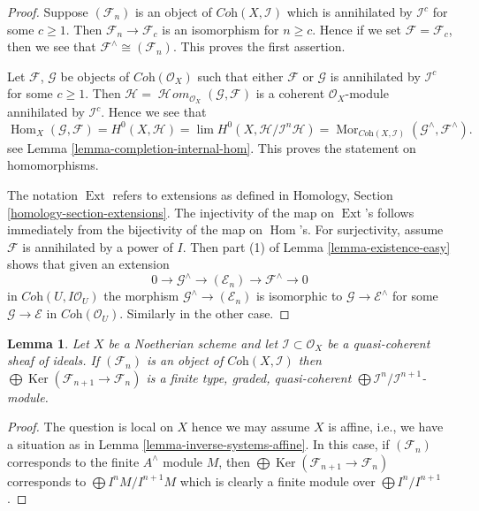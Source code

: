 \documentclass{stacks-project}
\theoremstyle{plain}
\newtheorem{lemma}[subsection]{Lemma}
\theoremstyle{definition}
\theoremstyle{remark}
\numberwithin{equation}{subsection}
\def\lim{\mathop{\mathrm{lim}}\nolimits}
\def\Hom{\mathop{\mathrm{Hom}}\nolimits}
\def\Ext{\mathop{\mathrm{Ext}}\nolimits}
\def\SheafHom{\mathop{\mathcal{H}\!\mathit{om}}\nolimits}
\def\Mor{\mathop{\mathrm{Mor}}\nolimits}
\def\Ker{\mathop{\mathrm{Ker}}}
\begin{document}
\begin{proof}
Suppose $(\mathcal{F}_n)$ is an object of $\textit{Coh}(X, \mathcal{I})$
which is annihilated by $\mathcal{I}^c$ for some $c \geq 1$. Then
$\mathcal{F}_n \to \mathcal{F}_c$ is an isomorphism for $n \geq c$.
Hence if we set $\mathcal{F} = \mathcal{F}_c$, then we see that
$\mathcal{F}^\wedge \cong (\mathcal{F}_n)$. This proves the first assertion.

\medskip\noindent
Let $\mathcal{F}$, $\mathcal{G}$ be objects of $\textit{Coh}(\mathcal{O}_X)$
such that either $\mathcal{F}$ or $\mathcal{G}$ is annihilated by
$\mathcal{I}^c$ for some $c \geq 1$. Then
$\mathcal{H} = \SheafHom_{\mathcal{O}_X}(\mathcal{G}, \mathcal{F})$
is a coherent $\mathcal{O}_X$-module annihilated by $\mathcal{I}^c$.
Hence we see that
$$
\Hom_X(\mathcal{G}, \mathcal{F}) =
H^0(X, \mathcal{H}) =
\lim H^0(X, \mathcal{H}/\mathcal{I}^n\mathcal{H}) =
\Mor_{\textit{Coh}(X, \mathcal{I})}
(\mathcal{G}^\wedge, \mathcal{F}^\wedge).
$$
see Lemma \ref{lemma-completion-internal-hom}.
This proves the statement on homomorphisms.

\medskip\noindent
The notation $\Ext$ refers to extensions as defined in
Homology, Section \ref{homology-section-extensions}.
The injectivity of the map on $\Ext$'s follows immediately
from the bijectivity of the map on $\Hom$'s.
For surjectivity, assume $\mathcal{F}$ is annihilated
by a power of $I$. Then part (1) of Lemma \ref{lemma-existence-easy}
shows that given an extension
$$
0 \to \mathcal{G}^\wedge \to (\mathcal{E}_n) \to \mathcal{F}^\wedge \to 0
$$
in $\textit{Coh}(U, I\mathcal{O}_U)$
the morphism $\mathcal{G}^\wedge \to (\mathcal{E}_n)$ is
isomorphic to $\mathcal{G} \to \mathcal{E}^\wedge$
for some $\mathcal{G} \to \mathcal{E}$ in $\textit{Coh}(\mathcal{O}_U)$.
Similarly in the other case.
\end{proof}

\begin{lemma}
\label{lemma-finite-over-rees-algebra}
Let $X$ be a Noetherian scheme and let $\mathcal{I} \subset \mathcal{O}_X$
be a quasi-coherent sheaf of ideals. If $(\mathcal{F}_n)$ is an object of
$\textit{Coh}(X, \mathcal{I})$ then
$\bigoplus \Ker(\mathcal{F}_{n + 1} \to \mathcal{F}_n)$ is
a finite type, graded, quasi-coherent
$\bigoplus \mathcal{I}^n/\mathcal{I}^{n + 1}$-module.
\end{lemma}

\begin{proof}
The question is local on $X$ hence we may assume $X$ is affine, i.e.,
we have a situation as in Lemma \ref{lemma-inverse-systems-affine}.
In this case, if $(\mathcal{F}_n)$ corresponds to the finite $A^\wedge$
module $M$, then $\bigoplus \Ker(\mathcal{F}_{n + 1} \to \mathcal{F}_n)$
corresponds to $\bigoplus I^nM/I^{n + 1}M$ which is clearly a finite
module over $\bigoplus I^n/I^{n + 1}$.
\end{proof}
\end{document}

